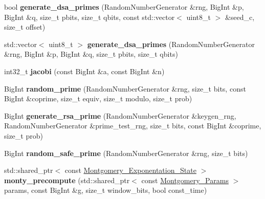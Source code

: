 \begin{DoxyCompactItemize}
\item 
\mbox{\label{namespace_botan_a866ab55bde5fea42a0925fa9fd461e8e}} 
bool {\bfseries generate\+\_\+dsa\+\_\+primes} (Random\+Number\+Generator \&rng, Big\+Int \&p, Big\+Int \&q, size\+\_\+t pbits, size\+\_\+t qbits, const std\+::vector$<$ uint8\+\_\+t $>$ \&seed\+\_\+c, size\+\_\+t offset)
\item 
\mbox{\label{namespace_botan_a8423b7454f670cd52ca9f0ab2f31db4a}} 
std\+::vector$<$ uint8\+\_\+t $>$ {\bfseries generate\+\_\+dsa\+\_\+primes} (Random\+Number\+Generator \&rng, Big\+Int \&p, Big\+Int \&q, size\+\_\+t pbits, size\+\_\+t qbits)
\item 
\mbox{\label{namespace_botan_ad70a33bf1947a3243c80bffdc307fa19}} 
int32\+\_\+t {\bfseries jacobi} (const Big\+Int \&a, const Big\+Int \&n)
\item 
\mbox{\label{namespace_botan_a2573e701a37658306ac0a4badc7b4d92}} 
Big\+Int {\bfseries random\+\_\+prime} (Random\+Number\+Generator \&rng, size\+\_\+t bits, const Big\+Int \&coprime, size\+\_\+t equiv, size\+\_\+t modulo, size\+\_\+t prob)
\item 
\mbox{\label{namespace_botan_aa6d66d8763a90430722520436620b33e}} 
Big\+Int {\bfseries generate\+\_\+rsa\+\_\+prime} (Random\+Number\+Generator \&keygen\+\_\+rng, Random\+Number\+Generator \&prime\+\_\+test\+\_\+rng, size\+\_\+t bits, const Big\+Int \&coprime, size\+\_\+t prob)
\item 
\mbox{\label{namespace_botan_added9e0a54d2f373c513e50d7b16db63}} 
Big\+Int {\bfseries random\+\_\+safe\+\_\+prime} (Random\+Number\+Generator \&rng, size\+\_\+t bits)
\item 
\mbox{\label{namespace_botan_a98120f4969f801e88531188c48b70574}} 
std\+::shared\+\_\+ptr$<$ const \mbox{\hyperlink{class_botan_1_1_montgomery___exponentation___state}{Montgomery\+\_\+\+Exponentation\+\_\+\+State}} $>$ {\bfseries monty\+\_\+precompute} (std\+::shared\+\_\+ptr$<$ const \mbox{\hyperlink{class_botan_1_1_montgomery___params}{Montgomery\+\_\+\+Params}} $>$ params, const Big\+Int \&g, size\+\_\+t window\+\_\+bits, bool const\+\_\+time)
\item 

\end{DoxyCompactItemize}
